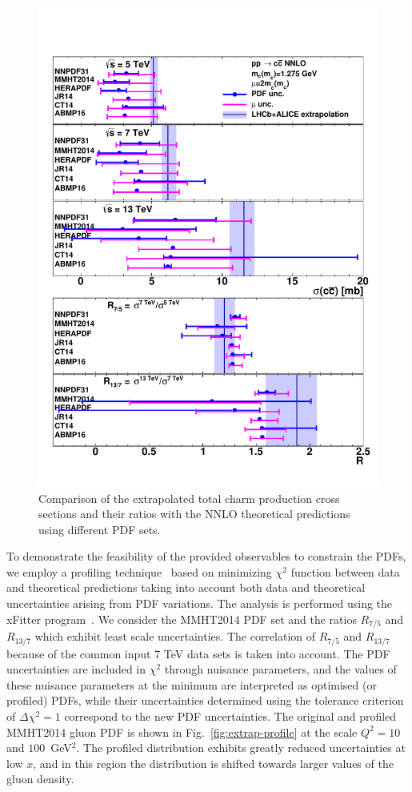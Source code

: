 \documentclass[12pt,a4paper]{article}
\begin{document}
\begin{figure}
    \centering
    \includegraphics[width=1.0\textwidth]{figs/pdf-nnlo/plot5.pdf}
    \caption{Comparison of the extrapolated total charm production cross sections and their ratios with the NNLO theoretical predictions using different PDF sets.}
    \label{fig:extrap}
\end{figure}

To demonstrate the feasibility of the provided observables to constrain the PDFs, we employ a profiling technique~\cite{Paukkunen:2014zia} based on minimizing $\chi^2$ function between data and theoretical predictions taking into account both data and theoretical uncertainties arising from PDF variations. The analysis is performed using the xFitter program~\cite{Alekhin:2014irh}. We consider the MMHT2014 PDF set and the ratios $R_{7/5}$ and $R_{13/7}$ which exhibit least scale uncertainties. The correlation of $R_{7/5}$ and $R_{13/7}$ because of the common input 7 TeV data sets is taken into account. The PDF uncertainties are included in $\chi^2$ through nuisance parameters, and the values of these nuisance parameters at the minimum are interpreted as optimised (or profiled) PDFs, while their uncertainties determined using the tolerance criterion of $\Delta\chi^2 = 1$ correspond to the new PDF uncertainties. The original and profiled MMHT2014 gluon PDF is shown in Fig.~\ref{fig:extrap-profile} at the scale $Q^2 = 10$ and $100$~GeV$^2$. The profiled distribution exhibits greatly reduced uncertainties at low $x$, and in this region the distribution is shifted towards larger values of the gluon density.
\end{document}
